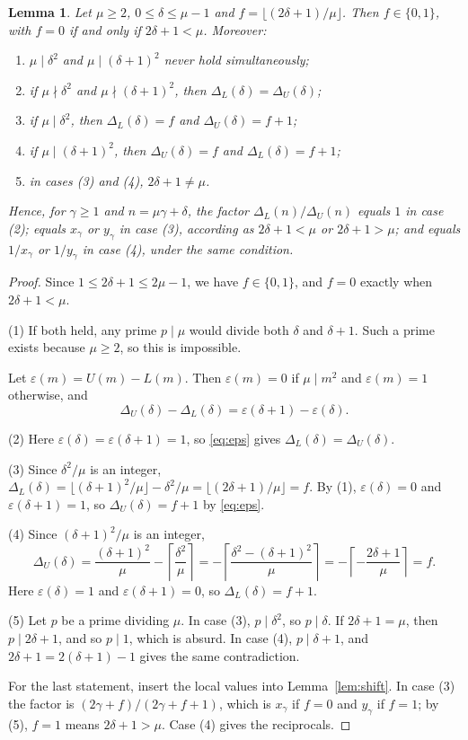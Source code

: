\documentclass{amsart}
\newtheorem{lemma}{Lemma}
\theoremstyle{definition}
\theoremstyle{remark}
\newcommand{\DL}{\Delta_L}
\newcommand{\DU}{\Delta_U}
\newcommand{\ceil}[1]{\left\lceil #1\right\rceil}
\begin{document}
\begin{lemma}\label{lem:local}
Let $\mu\ge2$, $0\le\delta\le\mu-1$ and $f=\lfloor(2\delta+1)/\mu\rfloor$. Then $f\in\{0,1\}$, with $f=0$ if and only if $2\delta+1<\mu$. Moreover:
\begin{enumerate}
\item $\mu\mid\delta^2$ and $\mu\mid(\delta+1)^2$ never hold simultaneously;
\item if $\mu\nmid\delta^2$ and $\mu\nmid(\delta+1)^2$, then $\DL(\delta)=\DU(\delta)$;
\item if $\mu\mid\delta^2$, then $\DL(\delta)=f$ and $\DU(\delta)=f+1$;
\item if $\mu\mid(\delta+1)^2$, then $\DU(\delta)=f$ and $\DL(\delta)=f+1$;
\item in cases (3) and (4), $2\delta+1\ne\mu$.
\end{enumerate}
Hence, for $\gamma\ge1$ and $n=\mu\gamma+\delta$, the factor $\DL(n)/\DU(n)$ equals $1$ in case (2); equals $x_\gamma$ or $y_\gamma$ in case (3), according as $2\delta+1<\mu$ or $2\delta+1>\mu$; and equals $1/x_\gamma$ or $1/y_\gamma$ in case (4), under the same condition.
\end{lemma}

\begin{proof}
Since $1\le2\delta+1\le2\mu-1$, we have $f\in\{0,1\}$, and $f=0$ exactly when $2\delta+1<\mu$.

(1) If both held, any prime $p\mid\mu$ would divide both $\delta$ and $\delta+1$. Such a prime exists because $\mu\ge2$, so this is impossible.

Let $\varepsilon(m)=U(m)-L(m)$. Then $\varepsilon(m)=0$ if $\mu\mid m^2$ and $\varepsilon(m)=1$ otherwise, and
\begin{equation}\label{eq:eps}
\DU(\delta)-\DL(\delta)=\varepsilon(\delta+1)-\varepsilon(\delta).
\end{equation}

(2) Here $\varepsilon(\delta)=\varepsilon(\delta+1)=1$, so \eqref{eq:eps} gives $\DL(\delta)=\DU(\delta)$.

(3) Since $\delta^2/\mu$ is an integer, $\DL(\delta)=\lfloor(\delta+1)^2/\mu\rfloor-\delta^2/\mu=\lfloor(2\delta+1)/\mu\rfloor=f$. By (1), $\varepsilon(\delta)=0$ and $\varepsilon(\delta+1)=1$, so $\DU(\delta)=f+1$ by \eqref{eq:eps}.

(4) Since $(\delta+1)^2/\mu$ is an integer,
\[
\DU(\delta)=\frac{(\delta+1)^2}{\mu}-\ceil{\frac{\delta^2}{\mu}}
=-\ceil{\frac{\delta^2-(\delta+1)^2}{\mu}}=-\ceil{-\frac{2\delta+1}{\mu}}=f.
\]
Here $\varepsilon(\delta)=1$ and $\varepsilon(\delta+1)=0$, so $\DL(\delta)=f+1$.

(5) Let $p$ be a prime dividing $\mu$. In case (3), $p\mid\delta^2$, so $p\mid\delta$. If $2\delta+1=\mu$, then $p\mid 2\delta+1$, and so $p\mid1$, which is absurd. In case (4), $p\mid\delta+1$, and $2\delta+1=2(\delta+1)-1$ gives the same contradiction.

For the last statement, insert the local values into Lemma~\ref{lem:shift}. In case (3) the factor is $(2\gamma+f)/(2\gamma+f+1)$, which is $x_\gamma$ if $f=0$ and $y_\gamma$ if $f=1$; by (5), $f=1$ means $2\delta+1>\mu$. Case (4) gives the reciprocals.
\end{proof}
\end{document}
